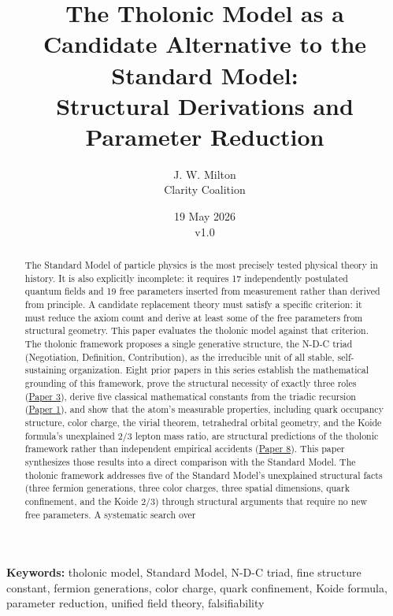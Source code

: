 \documentclass[12pt]{article}
\title{The Tholonic Model as a Candidate Alternative to the Standard Model:\\
\large Structural Derivations and Parameter Reduction}
\author{J. W. Milton\\[4pt]{\small Clarity Coalition}}
\date{\small 19 May 2026 \\ v1.0}
\begin{document}
\maketitle

\noindent\textbf{Keywords:} tholonic model, Standard Model, N-D-C triad, fine structure constant, fermion generations, color charge, quark confinement, Koide formula, parameter reduction, unified field theory, falsifiability

\begin{abstract}
The Standard Model of particle physics is the most precisely tested
physical theory in history. It is also explicitly incomplete: it
requires 17 independently postulated quantum fields and 19 free
parameters inserted from measurement rather than derived from principle.
A candidate replacement theory must satisfy a specific criterion: it
must reduce the axiom count and derive at least some of the free
parameters from structural geometry. This paper evaluates the tholonic
model against that criterion. The tholonic framework proposes a single
generative structure, the N-D-C triad (Negotiation, Definition,
Contribution), as the irreducible unit of all stable, self-sustaining
organization. Eight prior papers in this series establish the
mathematical grounding of this framework, prove the structural necessity
of exactly three roles
(\href{https://github.com/baardev/truevalue/blob/main/docnav/Research/papers/3_minimal-recursive-triadic-framework/3_minimal-recursive-triadic-framework.pdf}{Paper
3}), derive five classical mathematical constants from the triadic
recursion
(\href{https://github.com/baardev/truevalue/blob/main/docnav/Research/papers/1_recursive-tholonic-five-constants/1_recursive-tholonic-five-constants.pdf}{Paper
1}), and show that the atom's measurable properties, including quark
occupancy structure, color charge, the virial theorem, tetrahedral
orbital geometry, and the Koide formula's unexplained \(2/3\) lepton
mass ratio, are structural predictions of the tholonic framework rather
than independent empirical accidents
(\href{https://github.com/baardev/truevalue/blob/main/docnav/Research/papers/8_atom-as-tholon-measurable-phenomena/8_atom-as-tholon-measurable-phenomena.pdf}{Paper
8}). This paper synthesizes those results into a direct comparison with
the Standard Model. The tholonic framework addresses five of the
Standard Model's unexplained structural facts (three fermion
generations, three color charges, three spatial dimensions, quark
confinement, and the Koide \(2/3\)) through structural arguments that
require no new free parameters. A systematic search over

\end{abstract}
\end{document}
